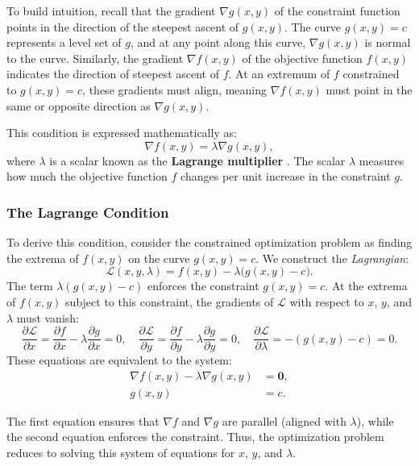 \noindent To build intuition, recall that the gradient \( \nabla g(x, y) \) of the constraint function points in the direction of the steepest ascent of \( g(x, y) \). The curve \( g(x, y) = c \) represents a level set of \( g \), and at any point along this curve, \( \nabla g(x, y) \) is normal to the curve. Similarly, the gradient \( \nabla f(x, y) \) of the objective function \( f(x, y) \) indicates the direction of steepest ascent of \( f \). At an extremum of \( f \) constrained to \( g(x, y) = c \), these gradients must align, meaning \( \nabla f(x, y) \) must point in the same or opposite direction as \( \nabla g(x, y) \).

\noindent This condition is expressed mathematically as:
\[
\nabla f(x, y) = \lambda \nabla g(x, y),
\]
where \( \lambda \) is a scalar known as the \textbf{Lagrange multiplier} . The scalar \( \lambda \) measures how much the objective function \( f \) changes per unit increase in the constraint \( g \).

\subsubsection*{The Lagrange Condition} 

\noindent To derive this condition, consider the constrained optimization problem as finding the extrema of \( f(x, y) \) on the curve \( g(x, y) = c \). We construct the \textit{Lagrangian}: 
\[
\mathcal{L}(x, y, \lambda) = f(x, y) - \lambda \big(g(x, y) - c\big).
\]
\noindent The term \( \lambda(g(x, y) - c) \) enforces the constraint \( g(x, y) = c \). At the extrema of \( f(x, y) \) subject to this constraint, the gradients of \( \mathcal{L} \) with respect to \( x \), \( y \), and \( \lambda \) must vanish:
\[
\frac{\partial \mathcal{L}}{\partial x} = \frac{\partial f}{\partial x} - \lambda \frac{\partial g}{\partial x} = 0, \quad
\frac{\partial \mathcal{L}}{\partial y} = \frac{\partial f}{\partial y} - \lambda \frac{\partial g}{\partial y} = 0, \quad
\frac{\partial \mathcal{L}}{\partial \lambda} = -(g(x, y) - c) = 0.
\]
\noindent These equations are equivalent to the system:
\[
\begin{aligned}
    \nabla f(x, y) - \lambda \nabla g(x, y) &= \mathbf{0}, \\
    g(x, y) &= c.
\end{aligned}
\]

\noindent The first equation ensures that \( \nabla f \) and \( \nabla g \) are parallel (aligned with \( \lambda \)), while the second equation enforces the constraint. Thus, the optimization problem reduces to solving this system of equations for \( x \), \( y \), and \( \lambda \). \\

